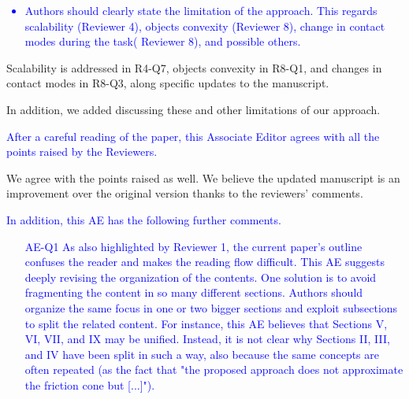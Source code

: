 \textcolor{blue}{
\begin{itemize}
    \item Authors should clearly state the limitation of the approach. This
regards scalability (Reviewer 4), objects convexity (Reviewer 8), change in
contact modes during the task( Reviewer 8), and possible others. \end{itemize}}

Scalability is addressed in R4-Q7, objects convexity in R8-Q1, and changes in
contact modes in R8-Q3, along specific updates to the manuscript.

In addition, we added  discussing these and other
limitations of our approach.


\vspace{5mm}
\textcolor{blue}{After a careful reading of the paper, this Associate Editor
agrees with all the points raised by the Reviewers.}

We agree with the points raised as well. We believe the updated manuscript is an
improvement over the original version thanks to the reviewers' comments.

\vspace{5mm}
\textcolor{blue}{In addition, this AE has the following further comments.}
\textcolor{blue}{
\begin{itemize}
    \item[AE-Q1] As also highlighted by Reviewer 1, the current paper's outline
confuses the reader and makes the reading flow difficult. This AE suggests
deeply revising the organization of the contents. One solution is to avoid
fragmenting the content in so many different sections. Authors should organize
the same focus in one or two bigger sections and exploit subsections to split
the related content. For instance, this AE believes that Sections V, VI, VII,
and IX may be unified. Instead, it is not clear why Sections II, III, and IV
have been split in such a way, also because the same concepts are often repeated
(as the fact that "the proposed approach does not approximate the friction cone
but [...]").\end{itemize}}

